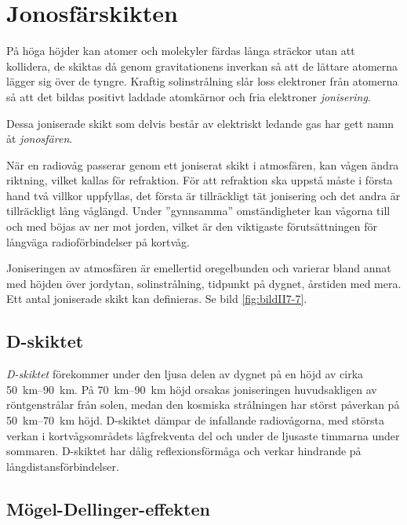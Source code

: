 \section{Jonosfärskikten}
\label{vågutbredning_jonosfärskikten}

På höga höjder kan atomer och molekyler färdas långa sträckor utan att
kollidera, de skiktas då genom gravitationens inverkan så att de lättare
atomerna lägger sig över de tyngre.
Kraftig solinstrålning slår loss elektroner från atomerna så att det bildas
positivt laddade atomkärnor och fria elektroner \emph{jonisering}.

Dessa joniserade skikt som delvis består av elektriskt ledande gas har
gett namn åt \emph{jonosfären}.

När en radiovåg passerar genom ett joniserat skikt i atmosfären, kan vågen
ändra riktning, vilket kallas för refraktion.
För att refraktion ska uppstå måste i första hand två villkor uppfyllas, det
första är tillräckligt tät jonisering och det andra är tillräckligt
lång våglängd.
Under ''gynnsamma'' omständigheter kan vågorna till och med böjas av
ner mot jorden, vilket är den viktigaste förutsättningen för långväga
radioförbindelser på kortvåg.

Joniseringen av atmosfären är emellertid oregelbunden och varierar
bland annat med höjden över jordytan, solinstrålning, tidpunkt på dygnet,
årstiden med mera.
Ett antal joniserade skikt kan definieras.
Se bild \ref{fig:bildII7-7}.

\subsection{D-skiktet}
\label{d-skiktet}

\emph{D-skiktet} förekommer under den ljusa delen av dygnet på en höjd av cirka
\SIrange{50}{90}{\kilo\metre}.
På \SIrange{70}{90}{\kilo\metre} höjd orsakas joniseringen huvudsakligen av
röntgenstrålar från solen, medan den kosmiska strålningen har störst påverkan på
\SIrange{50}{70}{\kilo\metre} höjd.
D-skiktet dämpar de infallande radiovågorna, med största verkan i
kortvågsområdets lågfrekventa del och under de ljusaste timmarna under sommaren.
D-skiktet har dålig reflexionsförmåga och verkar hindrande på
långdistansförbindelser.

\subsection{Mögel-Dellinger-effekten}

